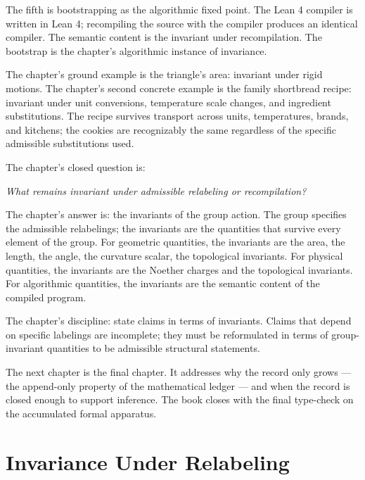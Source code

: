\begin{chapteressay}
The fifth is bootstrapping as the algorithmic fixed point. The
Lean 4 compiler is written in Lean 4; recompiling the source
with the compiler produces an identical compiler. The semantic
content is the invariant under recompilation. The bootstrap is
the chapter's algorithmic instance of invariance.

The chapter's ground example is the triangle's area: invariant
under rigid motions. The chapter's second concrete example is
the family shortbread recipe: invariant under unit conversions,
temperature scale changes, and ingredient substitutions. The
recipe survives transport across units, temperatures, brands, and
kitchens; the cookies are recognizably the same regardless of the
specific admissible substitutions used.

The chapter's closed question is:

\begin{center}
\emph{What remains invariant under admissible relabeling or
recompilation?}
\end{center}

The chapter's answer is: the invariants of the group action. The
group specifies the admissible relabelings; the invariants are
the quantities that survive every element of the group. For
geometric quantities, the invariants are the area, the length,
the angle, the curvature scalar, the topological invariants. For
physical quantities, the invariants are the Noether charges and
the topological invariants. For algorithmic quantities, the
invariants are the semantic content of the compiled program.

The chapter's discipline: state claims in terms of invariants.
Claims that depend on specific labelings are incomplete; they
must be reformulated in terms of group-invariant quantities to
be admissible structural statements.

The next chapter is the final chapter. It addresses why the record
only grows --- the append-only property of the mathematical
ledger --- and when the record is closed enough to support
inference. The book closes with the final type-check on the
accumulated formal apparatus.

\end{chapteressay}

\section{Invariance Under Relabeling}
\label{se:invariance-under-relabeling}

